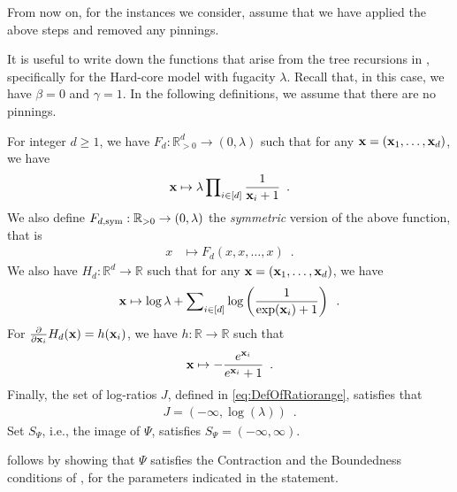 \documentclass[11pt,reqno]{amsart}
\numberwithin{equation}{section}
\newcommand{\capri}[1]{{\color{capri}#1}}
\newcommand{\heliotrope}[1]{{\color{heliotrope}#1}}
\newcommand{\potF}{{\Psi}}
\newcommand{\trecur}{F}
\newcommand{\logtrecur}{H}
\newcommand{\dlogtrecur}{h}
\newcommand{\ratiorange}{J}
\renewcommand{\capri}[1]{#1}
\renewcommand{\heliotrope}[1]{#1}
\newcommand{\ki}{\capri{i}}
\newcommand{\kx}{\heliotrope{x}}
\renewcommand{\ki}{i}
\renewcommand{\kx}{x}
\begin{document}
From now on, for the instances we consider, assume that we have applied the above steps and
removed any pinnings. 


It is useful to write down the functions that arise from the tree recursions
in , specifically for 
the Hard-core model with fugacity $\lambda$. 
%
Recall that, in this case, we have $\beta=0$ and $\gamma=1$. 
In the following definitions, we assume that there are no pinnings. 

For integer $d\geq 1$, we have  $\trecur_d:\mathbb{R}^d_{>0}\to (0, \lambda)$ such that 
for any ${\bf \kx}=({\bf \kx}_1, \ldots, {\bf \kx}_d)$, we have  
{\small 
\begin{align}\label{eq:HC-BPRecursion}
%
{\bf \kx}\mapsto \lambda \prod\nolimits_{\ki\in [d]}\frac{1}{{\bf \kx}_{\ki}+1} \enspace.
\end{align}
}
We also define $\trecur_{d,{\rm sym}}:\mathbb{R}_{>0}\to (0, \lambda)$ the {\em symmetric} version 
of the above function, that is
\begin{align}\label{def:SymTreeHC}
\kx&\mapsto \trecur_d(\kx,\kx,\ldots, \kx) \enspace.
\end{align}
We also have $\logtrecur_d:\mathbb{R}^d\to \mathbb{R}$ such that for any 
${\bf \kx}=({\bf \kx}_1, \ldots, {\bf \kx}_d)$, we have  
{\small
\begin{align}\label{eq:HC-DefOfH}
{\bf \kx} \mapsto \log \lambda+\sum\nolimits_{\ki\in [d]}
\log\left( \frac{1}{\exp({\bf \kx}_{\ki})+1} \right) \enspace.
\end{align}
}
For $\frac{\partial }{\partial {\bf \kx}_{\ki}}\logtrecur_d({\bf x})=\dlogtrecur({\bf \kx}_{\ki})$, 
we have $\dlogtrecur:\mathbb{R} \to \mathbb{R}$ such that 
{\small
\begin{align}\label{def:GradientRecHC}
% 
{\bf  \kx} \mapsto -\frac{e^{{\bf \kx}_{\ki}}}{e^{{\bf \kx}_{\ki}}+1} \enspace.
\end{align}
}
%
Finally, the set of log-ratios $\ratiorange$, defined in \eqref{eq:DefOfRatiorange}, 
satisfies that 
\begin{align}\label{eq:RangeJ4HC}
 \ratiorange=(-\infty, \log(\lambda)) \enspace.
\end{align} 
Set $S_{\potF}$, i.e., the image of $\potF$, satisfies $S_{\potF}=(-\infty, \infty)$. 




\newcommand{\easyspace}{Q_{\potF}}
\newcommand{\easyspaceX}{L_{\potF}}



   follows by showing that $\potF$ satisfies the Contraction
and the Boundedness conditions of , for the parameters indicated in the statement.
\end{document}
